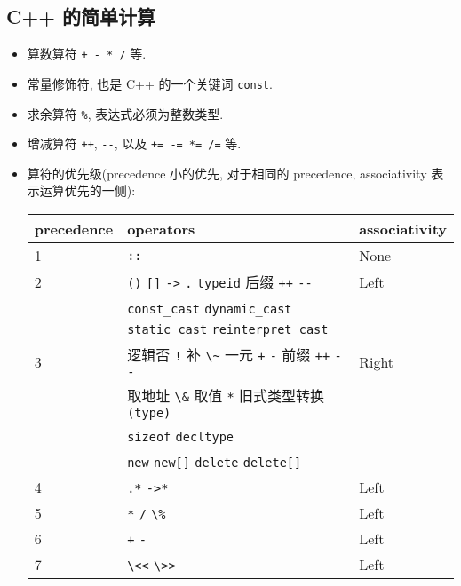 \documentclass[a4paper,UTF8]{ctexart}
\begin{document}
\subsection{C++ 的简单计算}
\begin{itemize}[leftmargin=0pt, rightmargin=0cm, labelwidth=0.8cm, labelsep=0.2cm]
\item 算数算符 \lstinline{+ - * /} 等.
\item 常量修饰符, 也是 C++ 的一个关键词 \lstinline{const}.
\item 求余算符 \lstinline{%}, 表达式必须为整数类型.
\item 增减算符 \lstinline{++}, \lstinline{--}, 以及 \lstinline{+= -= *= /=} 等.
\item 算符的优先级(precedence 小的优先, 对于相同的 precedence, associativity 表
  示运算优先的一侧):
  \vspace{-5pt}
  \begin{center}
  \begin{tabularx}{\textwidth}{| X | l | X |}
  \hline
   precedence & operators & associativity \\ \hline
   1 & \lstinline$::$ & None \\ \hline
   2 & \lstinline$()$ \quad \lstinline$[]$ \quad \lstinline$->$ \quad
   \lstinline$.$ \quad \lstinline$typeid$ \quad 后缀 \lstinline$++$ \quad
   \lstinline$--$ & Left \\
   & \lstinline$const_cast$ \quad \lstinline$dynamic_cast$ \quad
   \lstinline$static_cast$ \quad \lstinline$reinterpret_cast$ & \\ \hline
   3 & 逻辑否 \lstinline$!$ \quad 补 \lstinline$\~$ \quad 一元 \lstinline$+$
   \quad \lstinline$-$ \quad 前缀 \lstinline$++$ \quad \lstinline$--$ & Right \\
   & 取地址 \lstinline$\&$ \quad 取值 \lstinline$*$ \quad 旧式类型转换
   \lstinline$(type)$ & \\
   & \lstinline$sizeof$ \quad \lstinline$decltype$ & \\
   & \lstinline$new$ \quad \lstinline$new[]$ \quad \lstinline$delete$ \quad
   \lstinline$delete[]$ & \\ \hline
   4 & \lstinline$.*$ \quad \lstinline$->*$ & Left \\ \hline
   5 & \lstinline$*$ \quad \lstinline$/$ \quad \lstinline$\%$ & Left \\ \hline
   6 & \lstinline$+$ \quad \lstinline$-$ & Left \\ \hline
   7 & \lstinline$\<<$ \quad \lstinline$\>>$ & Left \\ \hline

\end{tabularx}
\end{center}
\end{itemize}
\end{document}
